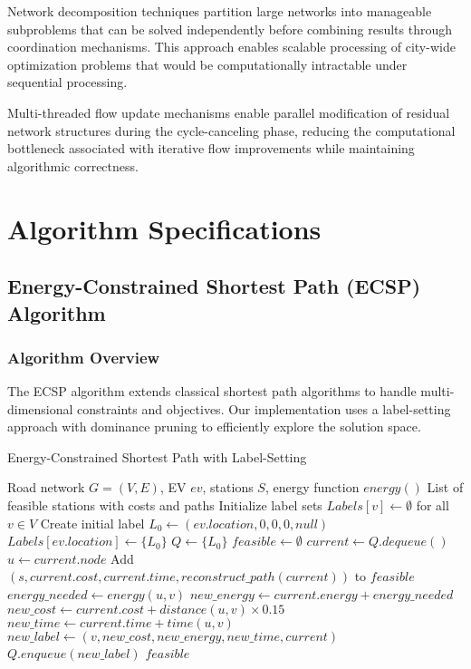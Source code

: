 \documentclass[12pt,a4paper]{article}
\begin{document}
Network decomposition techniques partition large networks into manageable subproblems that can be solved independently before combining results through coordination mechanisms. This approach enables scalable processing of city-wide optimization problems that would be computationally intractable under sequential processing.

Multi-threaded flow update mechanisms enable parallel modification of residual network structures during the cycle-canceling phase, reducing the computational bottleneck associated with iterative flow improvements while maintaining algorithmic correctness.

\section{Algorithm Specifications}

\subsection{Energy-Constrained Shortest Path (ECSP) Algorithm}

\subsubsection{Algorithm Overview}
The ECSP algorithm extends classical shortest path algorithms to handle multi-dimensional constraints and objectives. Our implementation uses a label-setting approach with dominance pruning to efficiently explore the solution space.

\begin{algorithm}
\caption{Energy-Constrained Shortest Path with Label-Setting}
\begin{algorithmic}[1]
\REQUIRE Road network $G=(V,E)$, EV $ev$, stations $S$, energy function $energy()$
\ENSURE List of feasible stations with costs and paths
\STATE Initialize label sets $Labels[v] \leftarrow \emptyset$ for all $v \in V$
\STATE Create initial label $L_0 \leftarrow (ev.location, 0, 0, 0, null)$
\STATE $Labels[ev.location] \leftarrow \{L_0\}$
\STATE $Q \leftarrow \{L_0\}$ 
\STATE $feasible \leftarrow \emptyset$
    \STATE $current \leftarrow Q.dequeue()$
    \STATE $u \leftarrow current.node$
            \STATE Add $(s, current.cost, current.time, reconstruct\_path(current))$ to $feasible$
        \ENDIF
    \ENDFOR
        \STATE $energy\_needed \leftarrow energy(u, v)$
        \STATE $new\_energy \leftarrow current.energy + energy\_needed$
        \STATE $new\_cost \leftarrow current.cost + distance(u,v) \times 0.15$
        \STATE $new\_time \leftarrow current.time + time(u,v)$
            \STATE $new\_label \leftarrow (v, new\_cost, new\_energy, new\_time, current)$
                \STATE $Q.enqueue(new\_label)$
            \ENDIF
        \ENDIF
    \ENDFOR
\ENDWHILE
\RETURN $feasible$
\end{algorithmic}
\end{algorithm}
\end{document}
